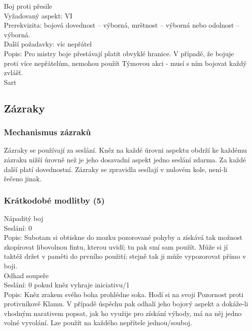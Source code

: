 Boj proti přesile\\
Vyžadovaný aspekt: VI\\
Prerekvizita: bojová dovednost – výborná, mrštnost – výborná nebo odolnost – výborná.\\
Další požadavky: víc nepřátel\\
Popis: Pro mistry boje přestávají platit obvyklé hranice. V případě, že bojuje proti více nepřátelům, nemohou použít Týmovou akci - musí s ním bojovat každý zvlášť.\\


Sart\\


\subsection{Zázraky}
\label{sec:subotam-zazraky}

\subsubsection{Mechanismus zázraků}
Zázraky se používají za seslání. Kněz na každé úrovni aspektu obdrží ke každému zázraku nižší úrovně než je jeho dosavadní aspekt jedno seslání zdarma. Za každé další platí dovednostní.  Zázraky se zpravidla sesílají v nulovém kole, není-li řečeno jinak.

\subsubsection{Krátkodobé modlitby (5)}

Nápaditý boj\\
Seslání: 0\\
Popis: Subotam si obtiskne do  mozku pozorované pohyby a  získává tak  možnost zkopírovat libovolnou fintu, kterou uvidí; tu pak smí sam použít. Může si jí taktéž držet v paměti do prvního použití; stejně tak ji může vypozorovat přímo v boji.\\


Odhad soupeře\\
Seslání: 0 pokud kněz vyhraje iniciativu/1\\
Popis: Kněz zrakem svého boha prohlédne soka. Hodí si na svoji Pozornost proti protivníkově Klamu. V případě úspěchu pak odhalí jeho bojový aspekt a dokáže-li vhodným narativem popsat, jak ho využije pro získání výhody, má na něj jedno volné vyvolání. Lze použít na každého nepřítele jednou/souboj. \\


